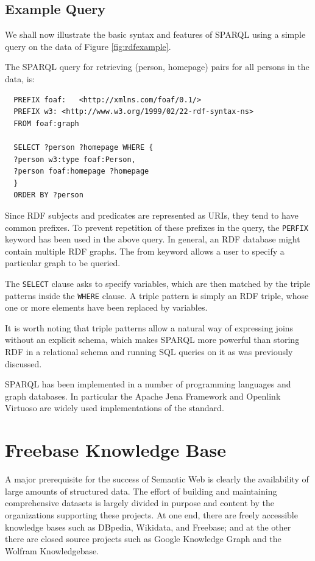 \documentclass[a4paper, twoside, 12pt]{report}
\begin{document}
\subsection{Example Query}

We shall now illustrate the basic syntax and features of SPARQL using a simple query on the data of Figure \ref{fig:rdfexample}.

The SPARQL query for retrieving (person, homepage) pairs for all persons in the data, is:
\begin{verbatim}
  PREFIX foaf:   <http://xmlns.com/foaf/0.1/>
  PREFIX w3: <http://www.w3.org/1999/02/22-rdf-syntax-ns>
  FROM foaf:graph

  SELECT ?person ?homepage WHERE {
  ?person w3:type foaf:Person,
  ?person foaf:homepage ?homepage
  }
  ORDER BY ?person
\end{verbatim}

Since RDF subjects and predicates are represented as URIs, they tend to have common prefixes. To prevent repetition of these prefixes in the query, the \verb|PERFIX| keyword has been used in the above query. In general, an RDF database might contain multiple RDF graphs. The from keyword allows a user to specify a particular graph to be queried.

The \verb|SELECT| clause asks to specify variables, which are then matched by the triple patterns inside the \verb|WHERE| clause. A triple pattern is simply an RDF triple, whose one or more elements have been replaced by variables.

It is worth noting that triple patterns allow a natural way of expressing joins without an explicit schema, which makes SPARQL more powerful than storing RDF in a relational schema and running SQL queries on it as was previously discussed.

SPARQL has been implemented in a number of programming languages and graph databases. In particular the Apache Jena Framework \cite{jena2013apache} and Openlink Virtuoso \cite{erling2009rdf} are widely used implementations of the standard.

\section{Freebase Knowledge Base}

A major prerequisite for the success of Semantic Web is clearly the availability of large amounts of structured data. The effort of building and maintaining comprehensive datasets is largely divided in purpose and content by the organizations supporting these projects. At one end, there are freely accessible knowledge bases such as DBpedia, Wikidata, and Freebase; and at the other there are closed source projects such as Google Knowledge Graph and the Wolfram Knowledgebase.
\end{document}
